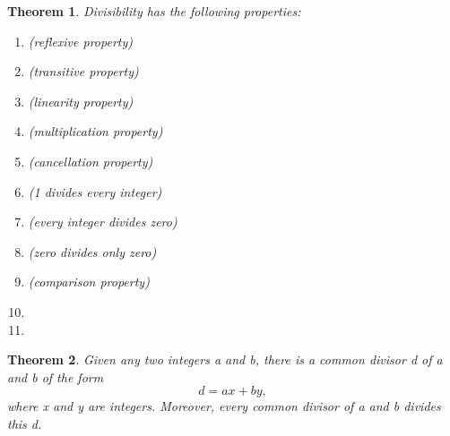 \documentclass[11pt]{article}
\newtheorem{theorem}{Theorem}
\begin{document}
\begin{theorem}
  Divisibility has the following properties:

  \begin{enumerate}
  \item {} (reflexive property)
  \item {} (transitive property)
  \item {} (linearity property)
  \item {} (multiplication property)
  \item {} (cancellation property)
  \item {} (1 divides every integer)
  \item {} (every integer divides zero)
  \item {} (zero divides only zero)
  \item {} (comparison property)
  \item {}
    \item {}
  \end{enumerate}
\end{theorem}

\begin{theorem}
  Given any two integers a and b, there is a common divisor d of a and b of the form
  \[
d = ax + by,
\]
where x and y are integers. Moreover, every common divisor of a and b divides this d.
\end{theorem}
\end{document}
